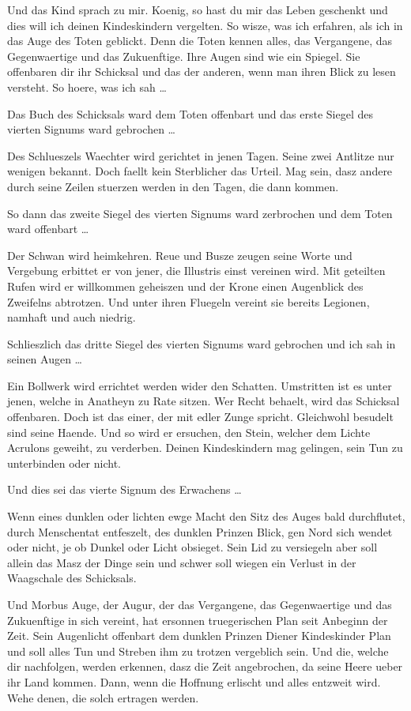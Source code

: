 \documentclass[a5paper,8pt]{book}
\begin{document}
Und das Kind sprach zu mir. Koenig, so hast du mir das Leben geschenkt und dies will ich deinen Kindeskindern vergelten. So wisze, was ich erfahren, als ich in das Auge des Toten geblickt. Denn die Toten kennen alles, das Vergangene, das Gegenwaertige und das Zukuenftige. Ihre Augen sind wie ein Spiegel. Sie offenbaren dir ihr Schicksal und das der anderen, wenn man ihren Blick zu lesen versteht. So hoere, was ich sah …

Das Buch des Schicksals ward dem Toten offenbart und das erste Siegel des vierten Signums ward gebrochen …

Des Schlueszels Waechter wird gerichtet in jenen Tagen. Seine zwei Antlitze nur wenigen bekannt. Doch faellt kein Sterblicher das Urteil. Mag sein, dasz andere durch seine Zeilen stuerzen werden in den Tagen, die dann kommen.

So dann das zweite Siegel des vierten Signums ward zerbrochen und dem Toten ward offenbart …

Der Schwan wird heimkehren. Reue und Busze zeugen seine Worte und Vergebung erbittet er von jener, die Illustris einst vereinen wird. Mit geteilten Rufen wird er willkommen geheiszen und der Krone einen Augenblick des Zweifelns abtrotzen. Und unter ihren Fluegeln vereint sie bereits Legionen, namhaft und auch niedrig.

Schlieszlich das dritte Siegel des vierten Signums ward gebrochen und ich sah in seinen Augen …

Ein Bollwerk wird errichtet werden wider den Schatten. Umstritten ist es unter jenen, welche in Anatheyn zu Rate sitzen. Wer Recht behaelt, wird das Schicksal offenbaren. Doch ist das einer, der mit edler Zunge spricht. Gleichwohl besudelt sind seine Haende. Und so wird er ersuchen, den Stein, welcher dem Lichte Acrulons geweiht, zu verderben. Deinen Kindeskindern mag gelingen, sein Tun zu unterbinden oder nicht.

Und dies sei das vierte Signum des Erwachens …

Wenn eines dunklen oder lichten ewge Macht den Sitz des Auges bald durchflutet, durch Menschentat entfeszelt, des dunklen Prinzen Blick, gen Nord sich wendet oder nicht, je ob Dunkel oder Licht obsieget. Sein Lid zu versiegeln aber soll allein das Masz der Dinge sein und schwer soll wiegen ein Verlust in der Waagschale des Schicksals.

Und Morbus Auge, der Augur, der das Vergangene, das Gegenwaertige und das Zukuenftige in sich vereint, hat ersonnen truegerischen Plan seit Anbeginn der Zeit. Sein Augenlicht offenbart dem dunklen Prinzen Diener Kindeskinder Plan und soll alles Tun und Streben ihm zu trotzen vergeblich sein. Und die, welche dir nachfolgen, werden erkennen, dasz die Zeit angebrochen, da seine Heere ueber ihr Land kommen. Dann, wenn die Hoffnung erlischt und alles entzweit wird. Wehe denen, die solch ertragen werden.
\end{document}
